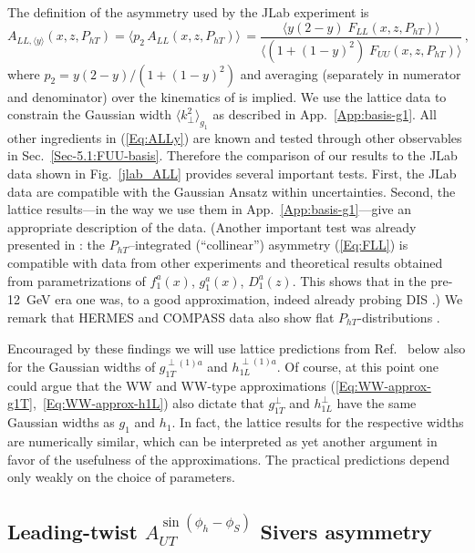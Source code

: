 \documentclass[a4paper,11pt]{article}
\newcommand{\be}{\begin{equation}}
\newcommand{\ee}{\end{equation}}
\newcommand{\la}{\langle}
\newcommand{\ra}{\rangle}
\newcommand{\bp}[1]{{\color[rgb]{0,0.65,0.35}#1}}
\def\Phperp{P_{hT}}
\def\kperp{k_\perp}
\begin{document}
The definition of the asymmetry used by the JLab experiment \cite{Avakian:2010ae} is
\be\label{Eq:ALLy}
	A_{LL,\la y\ra}(x,z,\Phperp)
	= \la p_2 \,A_{LL}(x,z,\Phperp) \ra \,
	= \frac{\la y (2-y) \; F_{LL}(x,z,\Phperp)\ra}
	{\la(1+(1-y)^2) \; F_{UU}(x,z,\Phperp)\ra} \, ,
\ee
where $p_2 = y (2-y)/(1+(1-y)^2)$ and averaging (separately in numerator
and denominator) over the kinematics of \cite{Avakian:2010ae} is implied.
We use the lattice data \cite{Hagler:2009mb} to
constrain the Gaussian width $\la\kperp^2\ra_{g_1}$ as described in
App.~\ref{App:basis-g1}. All other ingredients in (\ref{Eq:ALLy}) are known
and tested through other observables in Sec.~\ref{Sec-5.1:FUU-basis}.
Therefore the comparison of our results to the JLab data \cite{Avakian:2010ae}
shown in Fig.~\ref{jlab_ALL} provides several important tests.
First, the JLab data \cite{Avakian:2010ae} are compatible
with the Gaussian Ansatz within uncertainties. Second, the lattice
results---in the way we use them in App.~\ref{App:basis-g1}---give an 
appropriate description of the data.
	(Another important test was already presented in
	\cite{Avakian:2010ae}: the $\Phperp$--integrated (``collinear'')
	asymmetry (\ref{Eq:FLL}) is compatible with data
	from other experiments and theoretical results obtained from
	parametrizations of $f_1^a(x)$, $g_1^a(x)$, $D_1^a(z)$. This
	shows that in the pre-12~GeV era one was, to a good
	approximation, indeed already probing DIS \cite{Avakian:2010ae}.)
\bp{We remark that HERMES and COMPASS data also show flat 
$P_{hT}$-distributions \cite{Adolph:2016vou,Airapetian:2018rlq}.}

Encouraged by these findings we will use lattice predictions from
Ref.~\cite{Hagler:2009mb} below also for the Gaussian widths of
$g_{1T}^{\perp(1)a}$ and $h_{1L}^{\perp(1)a}$.
Of course, at this point one could argue that the WW and WW-type
approximations (\ref{Eq:WW-approx-g1T},~\ref{Eq:WW-approx-h1L}) also
dictate that $g_{1T}^\perp$ and $h_{1L}^\perp$ have the same Gaussian
widths as $g_1$ and $h_1$. In fact, the lattice results for the
respective widths are numerically similar, which can be interpreted as
yet another argument in favor of the usefulness of the approximations.
The practical predictions depend only weakly on the choice of parameters.




\subsection{\boldmath Leading-twist $A_{UT}^{\sin(\phi_h-\phi_S)}$ Sivers asymmetry}
\label{Sec-5.3:Sivers-basis}
\end{document}
